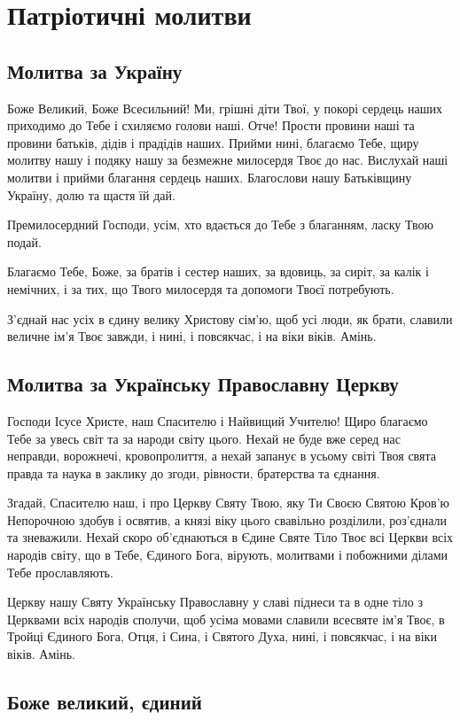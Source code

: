 \documentclass[chapters.tex]{subfiles}
\begin{document}
\chapter{Патріотичні молитви}
\section{Молитва за Україну}
Боже Великий, Боже Всесильний! Ми, грішні діти Твої, у покорі сердець наших приходимо до Тебе і схиляємо голови наші. Отче! Прости провини наші та провини батьків, дідів і прадідів наших. Прийми нині, благаємо Тебе, щиру молитву нашу і подяку нашу за безмежне милосердя Твоє до нас. Вислухай наші молитви і прийми благання сердець наших. Благослови нашу Батьківщину Україну, долю та щастя їй дай.

Премилосердний Господи, усім, хто вдається до Тебе з благанням, ласку Твою подай.

Благаємо Тебе, Боже, за братів і сестер наших, за вдовиць, за сиріт, за калік і немічних, і за тих, що Твого милосердя та допомоги Твоєї потребують.

З’єднай нас усіх в єдину велику Христову сім’ю, щоб усі люди, як брати, славили величне ім’я Твоє завжди, і нині, і повсякчас, і на віки віків. Амінь.

\section{Молитва за Українську Православну Церкву}
Господи Ісусе Христе, наш Спасителю і Найвищий Учителю! Щиро благаємо Тебе за увесь світ та за народи світу цього. Нехай не буде вже серед нас неправди, ворожнечі, кровопролиття, а нехай запанує в усьому світі Твоя свята правда та наука в заклику до згоди, рівности, братерства та єднання.

Згадай, Спасителю наш, і про Церкву Святу Твою, яку Ти Своєю Святою Кров’ю Непорочною здобув і освятив, а князі віку цього свавільно розділили, роз’єднали та зневажили. Нехай скоро об’єднаються в Єдине Святе Тіло Твоє всі Церкви всіх народів світу, що в Тебе, Єдиного Бога, вірують, молитвами і побожними ділами Тебе прославляють.

Церкву нашу Святу Українську Православну у славі піднеси та в одне тіло з Церквами всіх народів сполучи, щоб усіма мовами славили всесвяте ім’я Твоє, в Тройці Єдиного Бога, Отця, і Сина, і Святого Духа, нині, і повсякчас, і на віки віків. Амінь.

\section{Боже великий, єдиний}
\end{document}
